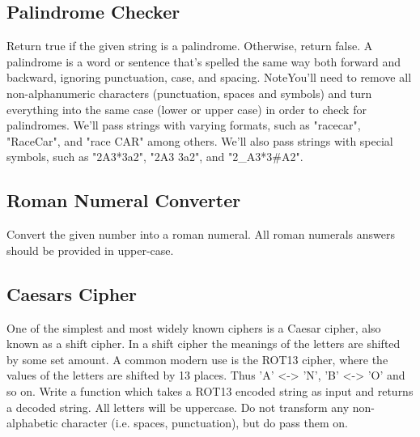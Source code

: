 \documentclass{article}%
\begin{document}
\subsection{Palindrome Checker}%
\label{subsec:PalindromeChecker}%
Return true if the given string is a palindrome. Otherwise, return false.\newline%
A palindrome is a word or sentence that's spelled the same way both forward and backward, ignoring punctuation, case, and spacing.\newline%
NoteYou'll need to remove all non{-}alphanumeric characters (punctuation, spaces and symbols) and turn everything into the same case (lower or upper case) in order to check for palindromes.\newline%
We'll pass strings with varying formats, such as "racecar", "RaceCar", and "race CAR" among others.\newline%
We'll also pass strings with special symbols, such as "2A3*3a2", "2A3  3a2", and "2\_A3*3\#A2".\newline%

%
\subsection{Roman Numeral Converter}%
\label{subsec:RomanNumeralConverter}%
Convert the given number into a roman numeral.\newline%
All roman numerals answers should be provided in upper{-}case.\newline%

%
\subsection{Caesars Cipher}%
\label{subsec:CaesarsCipher}%
One of the simplest and most widely known ciphers is a Caesar cipher, also known as a shift cipher. In a shift cipher the meanings of the letters are shifted by some set amount.\newline%
A common modern use is the ROT13 cipher, where the values of the letters are shifted by 13 places. Thus 'A' <{-}> 'N', 'B' <{-}>  'O' and so on.\newline%
Write a function which takes a ROT13 encoded string as input and returns a decoded string.\newline%
All letters will be uppercase. Do not transform any non{-}alphabetic character (i.e. spaces, punctuation), but do pass them on.\newline%

%
\end{document}
